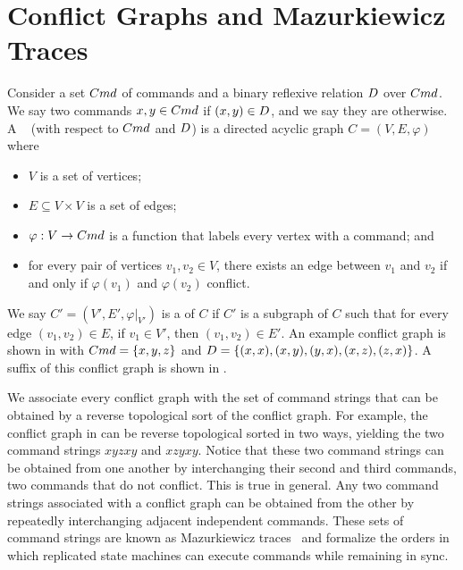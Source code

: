 \section{Conflict Graphs and Mazurkiewicz Traces}
Consider a set $Cmd$ of commands and a binary reflexive relation $D$
over $Cmd$. We say two commands $x, y \in Cmd$  if $(x, y)
\in D$, and we say they are  otherwise. A
~\cite{mazurkiewicz1995introduction} (with respect to
$Cmd$ and $D$) is a directed acyclic graph $C = (V, E, \varphi)$ where
\begin{itemize}
  \item
    $V$ is a set of vertices;
  \item
    $E \subseteq V \times V$ is a set of edges;
  \item
    $\varphi: V \to Cmd$ is a function that labels every vertex with a command;
    and
  \item
    for every pair of vertices $v_1, v_2 \in V$, there exists an edge between
    $v_1$ and $v_2$ if and only if $\varphi(v_1)$ and $\varphi(v_2)$ conflict.
\end{itemize}

We say $C' = (V', E', \varphi|_{V'})$ is a  of $C$ if $C'$ is a
subgraph of $C$ such that for every edge $(v_1, v_2) \in E$, if $v_1 \in V'$,
then $(v_1, v_2) \in E'$.
%
An example conflict graph is shown in  with $Cmd
= \{x, y, z\}$ and $D = \{(x, x), (x, y), (y, x), (x, z), (z,
x)\}$. A suffix of this conflict graph is shown in .



We associate every conflict graph with the set of command strings that can be
obtained by a reverse topological sort of the conflict graph. For example, the
conflict graph in  can be reverse topological
sorted in two ways, yielding the two command strings $xyzxy$ and $xzyxy$.
Notice that these two command strings can be obtained from one another by
interchanging their second and third commands, two commands that do not
conflict. This is true in general. Any two command strings associated with a
conflict graph can be obtained from the other by repeatedly interchanging
adjacent independent commands. These sets of command strings are known as
Mazurkiewicz traces~\cite{mazurkiewicz1985semantics,
mazurkiewicz1995introduction} and formalize the orders in which replicated
state machines can execute commands while remaining in sync.

